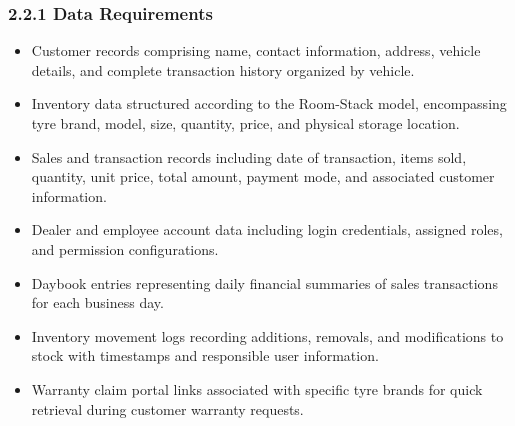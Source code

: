 \documentclass[12pt, oneside]{article}
\begin{document}
\subsubsection*{2.2.1 Data Requirements}
\begin{itemize}
    \item Customer records comprising name, contact information, address, vehicle details, and complete transaction history organized by vehicle.
    \item Inventory data structured according to the Room-Stack model, encompassing tyre brand, model, size, quantity, price, and physical storage location.
    \item Sales and transaction records including date of transaction, items sold, quantity, unit price, total amount, payment mode, and associated customer information.
    \item Dealer and employee account data including login credentials, assigned roles, and permission configurations.
    \item Daybook entries representing daily financial summaries of sales transactions for each business day.
    \item Inventory movement logs recording additions, removals, and modifications to stock with timestamps and responsible user information.
    \item Warranty claim portal links associated with specific tyre brands for quick retrieval during customer warranty requests.
\end{itemize}

\vspace{0.5em}
\end{document}
